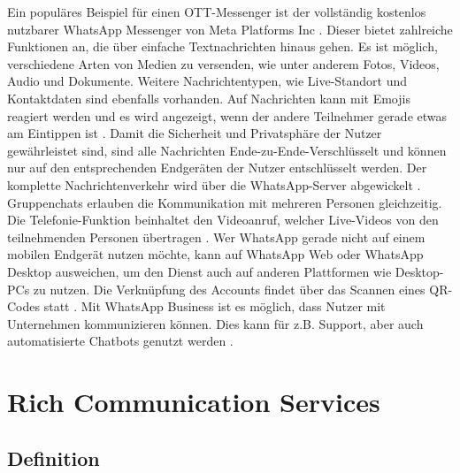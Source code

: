 \documentclass[conference]{IEEEtran}
\begin{document}
Ein populäres Beispiel für einen OTT-Messenger ist der vollständig kostenlos nutzbarer WhatsApp Messenger von Meta Platforms Inc \cite{wakostenlos}.
Dieser bietet zahlreiche Funktionen an, die über einfache Textnachrichten hinaus gehen.
Es ist möglich, verschiedene Arten von Medien zu versenden, wie unter anderem Fotos, Videos, Audio und Dokumente.
Weitere Nachrichtentypen, wie Live-Standort und Kontaktdaten sind ebenfalls vorhanden.
Auf Nachrichten kann mit Emojis reagiert werden und es wird angezeigt, wenn der andere Teilnehmer gerade etwas am Eintippen ist \cite{wafaq}.
Damit die Sicherheit und Privatsphäre der Nutzer gewährleistet sind, sind alle Nachrichten Ende-zu-Ende-Verschlüsselt und können nur auf den entsprechenden Endgeräten der Nutzer entschlüsselt werden.
Der komplette Nachrichtenverkehr wird über die WhatsApp-Server abgewickelt \cite{waencryption}.
Gruppenchats erlauben die Kommunikation mit mehreren Personen gleichzeitig. Die Telefonie-Funktion beinhaltet den Videoanruf, welcher Live-Videos von den teilnehmenden Personen übertragen \cite{wafaq}.
Wer WhatsApp gerade nicht auf einem mobilen Endgerät nutzen möchte, kann auf WhatsApp Web oder WhatsApp Desktop ausweichen, um den Dienst auch auf anderen Plattformen wie Desktop-PCs zu nutzen.
Die Verknüpfung des Accounts findet über das Scannen eines QR-Codes statt \cite{wafaq,waencryption}.
Mit WhatsApp Business ist es möglich, dass Nutzer mit Unternehmen kommunizieren können. Dies kann für z.B. Support, aber auch automatisierte Chatbots genutzt werden \cite{wafaq}.


\section{Rich Communication Services}

\subsection{Definition}
\end{document}
